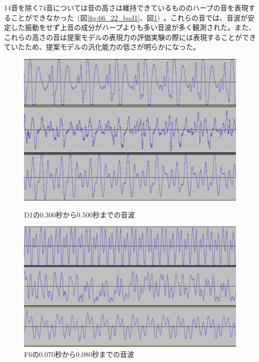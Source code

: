 14音を除く74音については音の高さは維持できているもののハープの音を表現することができなかった~(図\ref{fig:66_22_bad1}、図\ref{fig:66_22_bad2})~。これらの音では、音波が安定した振動をせず上音の成分がハープよりも多い音波が多く観測された。また、これらの高さの音は提案モデルの表現力の評価実験の際には表現することができていたため、提案モデルの汎化能力の低さが明らかになった。

\begin{figure}[b]
\begin{center}
\begin{minipage}{0.48\hsize}
\begin{center}
\includegraphics[width=0.75\hsize]{figure/66_22_det/d1_0300_0500.png}
\caption{D1の0.300秒から0.500秒までの音波}
\label{fig:66_22_bad1}
\end{center}
\end{minipage}
\begin{minipage}{0.48\hsize}
\begin{center}
\includegraphics[width=0.85\hsize]{figure/66_22_det/f6_0070_0080.png}
\caption{F6の0.070秒から0.080秒までの音波}
\label{fig:66_22_bad2}
\end{center}
\end{minipage}
\end{center}
\end{figure}

